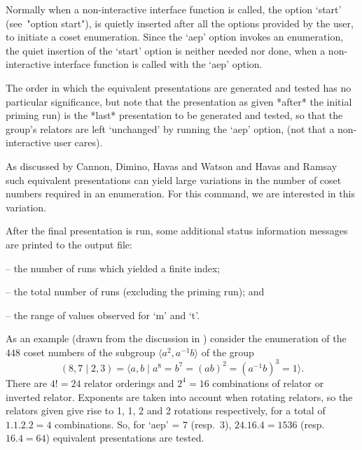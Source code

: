 Normally when a non-interactive {\ACE} interface function  is  called,
the option `start' (see~"option start"), is quietly inserted after all
the options provided by the user, to  initiate  a  coset  enumeration.
Since the `aep' option invokes an enumeration, the quiet insertion  of
the `start' option is neither needed nor done, when a  non-interactive
{\ACE} interface function is called with the `aep' option.

The order in which the  equivalent  presentations  are  generated  and
tested has no particular significance, but note that the  presentation
as given *after* the initial priming run) is the  *last*  presentation
to be generated and tested, so that  the  group's  relators  are  left
`unchanged' by running the `aep' option, (not that  a  non-interactive
user cares).

As discussed by Cannon, Dimino, Havas  and  Watson  \cite{CDHW73}  and
Havas and Ramsay \cite{HR01} such equivalent presentations  can  yield
large variations in  the  number  of  coset  numbers  required  in  an
enumeration. For this command, we are interested in this variation.

After  the  final  presentation  is  run,   some   additional   status
information messages are printed to the {\ACE} output file:

\beginlist%

\item{--}  the number of runs which yielded a finite index; 

\item{--}  the total number of runs (excluding the priming run); and 

\item{--}  the range of values observed for `m' and `t'.

\endlist

As an example (drawn from the discussion in \cite{HR99ace}) consider the
enumeration   of   the   $448$   coset   numbers   of   the   subgroup
$\langle  a^2,a^{-1}b \rangle$ of the group
$$
(8,7 \mid 2,3) 
    = \langle a,b \mid a^8 = b^7 = (ab)^2 = (a^{-1}b)^3 = 1 \rangle.
$$
There are $4!=24$  relator  orderings  and  $2^4=16$  combinations  of
relator or inverted relator. Exponents are  taken  into  account  when
rotating relators, so the relators given give rise to 1, 1,  2  and  2
rotations respectively, for a total of $1.1.2.2=4$  combinations.  So,
for  `aep'  =  $7$   (resp.~$3$),   $24.16.4=1536$   (resp.~$16.4=64$)
equivalent presentations are tested.

